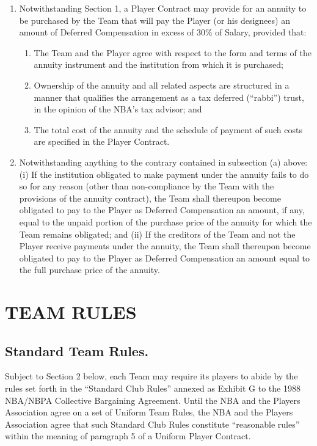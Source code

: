 \documentclass[
]{book}
\providecommand{\tightlist}{%
  \setlength{\itemsep}{0pt}\setlength{\parskip}{0pt}}
\begin{document}
\begin{enumerate}
\def\labelenumi{(\alph{enumi})}
\tightlist
\item
  Notwithstanding Section 1, a Player Contract may provide for an annuity to be purchased by the Team that will pay the Player (or his designees) an amount of Deferred Compensation in excess of 30\% of Salary, provided that:

  \begin{enumerate}
  \def\labelenumii{(\roman{enumii})}
  \tightlist
  \item
    The Team and the Player agree with respect to the form and terms of the annuity instrument and the institution from which it is purchased;
  \item
    Ownership of the annuity and all related aspects are structured in a manner that qualifies the arrangement as a tax deferred (``rabbi'') trust, in the opinion of the NBA's tax advisor; and
  \item
    The total cost of the annuity and the schedule of payment of such costs are specified in the Player Contract.
  \end{enumerate}
\item
  Notwithstanding anything to the contrary contained in subsection (a) above:(i) If the institution obligated to make payment under the annuity fails to do so for any reason (other than non-compliance by the Team with the provisions of the annuity contract), the Team shall thereupon become obligated to pay to the Player as Deferred Compensation an amount, if any, equal to the unpaid portion of the purchase price of the annuity for which the Team remains obligated; and (ii) If the creditors of the Team and not the Player receive payments under the annuity, the Team shall thereupon become obligated to pay to the Player as Deferred Compensation an amount equal to the full purchase price of the annuity.
\end{enumerate}

\hypertarget{team-rules}{%
\chapter{TEAM RULES}\label{team-rules}}

\hypertarget{standard-team-rules.}{%
\section{Standard Team Rules.}\label{standard-team-rules.}}

Subject to Section 2 below, each Team may require its players to abide by the rules set forth in the ``Standard Club Rules'' annexed as Exhibit G to the 1988 NBA/NBPA Collective Bargaining Agreement. Until the NBA and the Players Association agree on a set of Uniform Team Rules, the NBA and the Players Association agree that such Standard Club Rules constitute ``reasonable rules'' within the meaning of paragraph 5 of a Uniform Player Contract.
\end{document}

